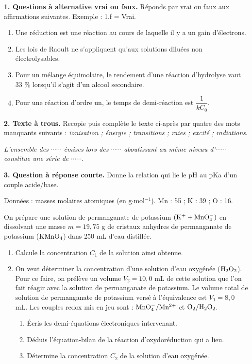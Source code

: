 \documentclass[11pt]{article}
\begin{document}



\noindent\textbf{1. Questions à alternative vrai ou faux.} Réponds par vrai ou faux aux affirmations suivantes. Exemple : 1.f = Vrai.
\begin{enumerate}[label=1.\alph*)]
  \item Une réduction est une réaction au cours de laquelle il y a un gain d'électrons.
  \item Les lois de Raoult ne s'appliquent qu'aux solutions diluées non électrolysables.
  \item Pour un mélange équimolaire, le rendement d'une réaction d'hydrolyse vaut 33 \% lorsqu'il s'agit d'un alcool secondaire.
  \item Pour une réaction d'ordre un, le temps de demi-réaction est $\dfrac{1}{kC_0}$.
\end{enumerate}

\medskip
\noindent\textbf{2. Texte à trous.} Recopie puis complète le texte ci-après par quatre des mots manquants suivants : \textit{ionisation ; énergie ; transitions ; raies ; excité ; radiations}.

\textit{L'ensemble des $\cdots\cdots$ émises lors des $\cdots\cdots$ aboutissant au même niveau d'$\cdots\cdots$ constitue une série de $\cdots\cdots$.}

\medskip
\noindent\textbf{3. Question à réponse courte.} Donne la relation qui lie le pH au pKa d'un couple acide/base.

\noindent Données : masses molaires atomiques (en g$\cdot$mol$^{-1}$). Mn : 55 ; K : 39 ; O : 16.

On prépare une solution de permanganate de potassium $(\mathrm{K^+} + \mathrm{MnO_4^-})$ en dissolvant une masse $m = 19{,}75$ g de cristaux anhydres de permanganate de potassium ($\mathrm{KMnO_4}$) dans 250 mL d'eau distillée.

\begin{enumerate}
  \item Calcule la concentration $C_1$ de la solution ainsi obtenue.
  \item On veut déterminer la concentration d'une solution d'eau oxygénée ($\mathrm{H_2O_2}$). Pour ce faire, on prélève un volume $V_2 = 10{,}0$ mL de cette solution que l'on fait réagir avec la solution de permanganate de potassium. Le volume total de solution de permanganate de potassium versé à l'équivalence est $V_1 = 8{,}0$ mL. Les couples redox mis en jeu sont : $\mathrm{MnO_4^-/Mn^{2+}}$ et $\mathrm{O_2/H_2O_2}$.
  \begin{enumerate}[label=\alph*.]
    \item Écris les demi-équations électroniques intervenant.
    \item Déduis l'équation-bilan de la réaction d'oxydoréduction qui a lieu.
    \item Détermine la concentration $C_2$ de la solution d'eau oxygénée.
  \end{enumerate}
\end{enumerate}
\end{document}
